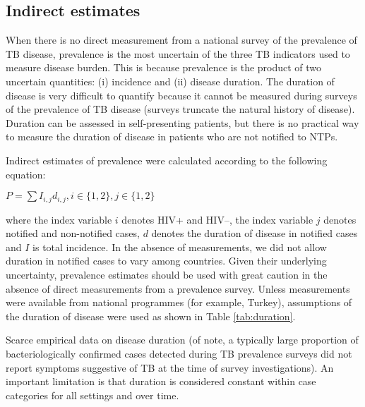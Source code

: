 \subsection{Indirect estimates}
When there is no direct measurement from a national survey of the prevalence of TB disease, prevalence is the most uncertain of the three TB indicators used to measure disease burden. This is because prevalence is the product of two uncertain quantities: (i) incidence and (ii) disease duration. The duration of disease is very difficult to quantify because it cannot be measured during surveys of the prevalence of TB disease (surveys truncate the natural history of disease). Duration can be assessed in self-presenting patients, but there is no practical way to measure the duration of disease in patients who are not notified to NTPs.

Indirect estimates of prevalence were calculated according to the following equation:

$P = \sum I_{i,j} d_{i,j}, i \in \lbrace 1, 2\rbrace, j \in \lbrace 1, 2\rbrace$

where the index variable $i$ denotes HIV+ and HIV–, the index variable $j$ denotes notified and non-notified cases, $d$ denotes the duration of disease in notified cases and $I$ is total incidence. In the absence of measurements, we did not allow duration in notified cases to vary among countries. Given their underlying uncertainty, prevalence estimates should be used with great caution in the absence of direct measurements from a prevalence survey. Unless measurements were available from national programmes (for example, Turkey), assumptions of the duration of disease were used as shown in Table \ref{tab:duration}.

Scarce empirical data on disease duration (of note, a typically large proportion of bacteriologically confirmed cases detected during TB prevalence surveys did not report symptoms suggestive of TB at the time of survey investigations). An important limitation is that duration is considered constant within case categories for all settings and over time.